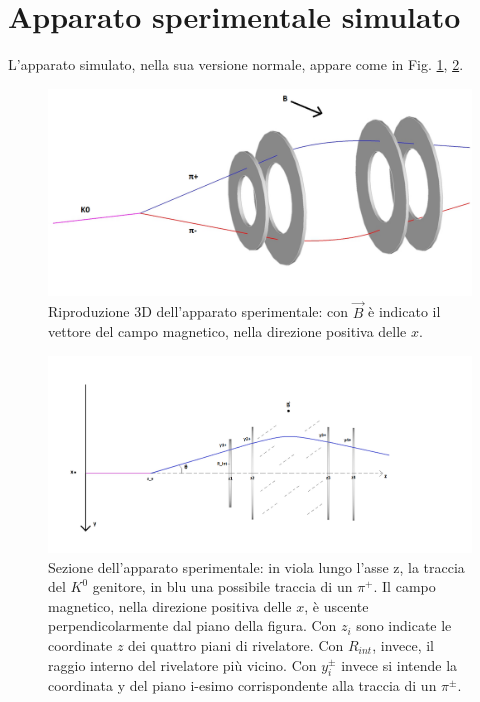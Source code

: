 \documentclass[8pt]{extarticle}
\begin{document}
\section{Apparato sperimentale simulato} \label{sec:apparato}
L'apparato simulato, nella sua versione normale, appare come in Fig. \ref{fig:apparato_3d}, \ref{fig:apparato_2d}.


\begin{figure}
	\begin{center}
		\includegraphics[scale=0.4]{apparato_3d} 
		\caption{Riproduzione 3D dell'apparato sperimentale: con $\vec{B}$ è indicato il vettore del campo magnetico, nella direzione positiva delle $x$.}
		\label{fig:apparato_3d}
	\end{center}
\end{figure}

\begin{figure}
	\begin{center}
		\includegraphics[scale=0.4]{apparato_2d}
		\caption{Sezione dell'apparato sperimentale: in viola lungo l'asse z, la traccia del $K^0$ genitore, in blu una possibile traccia di un $\pi^+$. Il campo magnetico, nella direzione positiva delle $x$, è uscente perpendicolarmente dal piano della figura. Con $z_i$ sono indicate le coordinate $z$ dei quattro piani di rivelatore. Con $R_{int}$, invece, il raggio interno del rivelatore più vicino. Con $y_i^{\pm}$ invece si intende la coordinata y del piano i-esimo corrispondente alla traccia di un $\pi^{\pm}$.}
		\label{fig:apparato_2d}
	\end{center}
\end{figure}
\end{document}
